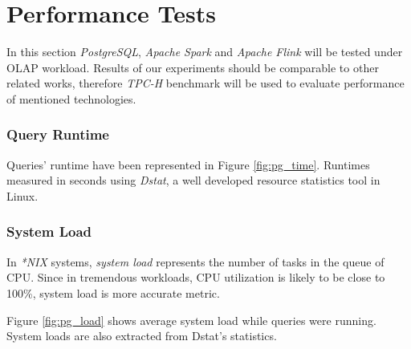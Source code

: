 \documentclass[report.tex]{subfiles}
\begin{document}
\section{Performance Tests}

In this section \textit{PostgreSQL}\cite{postgres}, \textit{Apache Spark}\cite{spark} and \textit{Apache Flink}\cite{flink} will be tested under OLAP workload. Results of our experiments should be comparable to other related works, therefore \textit{TPC-H}\cite{tpch} benchmark will be used to evaluate performance of mentioned technologies.

\subsubsection{Query Runtime}
Queries' runtime have been represented in Figure \ref{fig:pg_time}. Runtimes measured in seconds using \textit{Dstat}\cite{dstat}, a well developed resource statistics tool in Linux.


\subsubsection{System Load}
In \textit{*NIX} systems, \textit{system load} represents the number of tasks in the queue of CPU. Since in tremendous workloads, CPU utilization is likely to be close to 100\%, system load is more accurate metric.

Figure \ref{fig:pg_load} shows average system load while queries were running. System loads are also extracted from Dstat's statistics.

\end{document}
